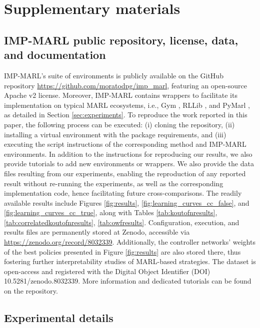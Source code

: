 \chapter{Supplementary materials} \label{ch:ch5_appendix}
\section{IMP-MARL public repository, license, data, and documentation}
\label{sec:ch5_appendix_imp_public_repo}
IMP-MARL's suite of environments is publicly available on the GitHub repository \url{https://github.com/moratodpg/imp\_marl}, featuring an open-source Apache v2 license.  Moreover, IMP-MARL contains wrappers to facilitate its implementation on typical MARL ecosystems, i.e., Gym \citep{openaigym}, RLLib \citep{liang2018rllib}, and PyMarl \citep{samvelyan2019starcraft}, as detailed in Section \ref{sec:experiments}.
To reproduce the work reported in this paper, the following process can be executed: (i) cloning the repository, (ii) installing a virtual environment with the package requirements, and (iii) executing the script instructions of the corresponding method and IMP-MARL environments.
In addition to the instructions for reproducing our results, we also provide tutorials to add new environments or wrappers.
We also provide the data files resulting from our experiments, enabling the reproduction of any reported result without re-running the experiments, as well as the corresponding implementation code, hence facilitating future cross-comparisons.
The readily available results include Figures \ref{fig:results}, \ref{fig:learning_curves_cc_false}, and \ref{fig:learning_curves_cc_true}, along with Tables \ref{tab:koutofnresults}, \ref{tab:correlatedkoutofnresults}, \ref{tab:owfresults}.
Configuration, execution, and results files are permanently stored at Zenodo, accessible via \url{https://zenodo.org/record/8032339}. 
Additionally, the controller networks' weights of the best policies presented in Figure \ref{fig:results} are also stored there, thus fostering further interpretability studies of MARL-based strategies.
The dataset is open-access and registered with the Digital Object Identifier (DOI) 10.5281/zenodo.8032339.
More information and dedicated tutorials can be found on the repository.


\section{Experimental details}
\label{sec:ch5_appendix_exp_details}
